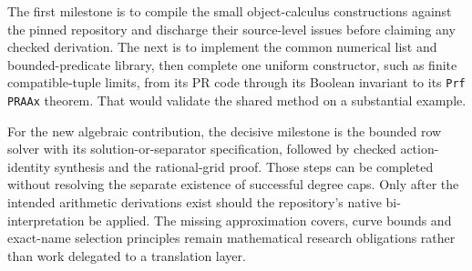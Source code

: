 The first milestone is to compile the small object-calculus constructions
against the pinned repository and discharge their source-level issues before
claiming any checked derivation. The next is to implement the common numerical
list and bounded-predicate library, then complete one uniform constructor,
such as finite compatible-tuple limits, from its PR code through its Boolean
invariant to its \texttt{Prf PRAAx} theorem. That would validate the shared
method on a substantial example.

For the new algebraic contribution, the decisive milestone is the bounded
row solver with its solution-or-separator specification, followed by checked
action-identity synthesis and the rational-grid proof. Those steps can be
completed without resolving the separate existence of successful degree caps.
Only after the intended arithmetic derivations exist should the repository's
native bi-interpretation be applied. The missing approximation covers,
curve bounds and exact-name selection principles remain mathematical research
obligations rather than work delegated to a translation layer.
